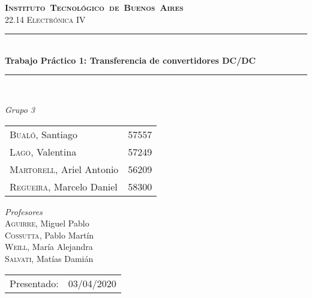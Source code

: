 \begin{titlepage}
\newcommand{\HRule}{\rule{\linewidth}{0.5mm}}
\center
\mbox{\textsc{\LARGE \bfseries {Instituto Tecnol\'ogico de Buenos Aires}}}\\[1.5cm]
\textsc{\Large 22.14 Electrónica IV}\\[0.5cm]


\HRule \\[0.6cm]
{ \Huge \bfseries Trabajo Pr\'actico 1: Transferencia de convertidores DC/DC}\\[0.4cm] %
\HRule \\[1.5cm]


{\large

\emph{Grupo 3}\\
\vspace{3px}

\begin{tabular}{lr} 	
\textsc{Bualó}, Santiago  & 57557 \\
\textsc{Lago}, Valentina  & 57249 \\
\textsc{Martorell}, Ariel Antonio & 56209 \\
\textsc{Regueira}, Marcelo Daniel  & 58300 \\
\end{tabular}

\vspace{20px}

\emph{Profesores}\\
\vspace{3px}
\textsc{Aguirre}, Miguel Pablo\\ 	
\textsc{Cossutta}, Pablo Martín\\ 	
\textsc{Weill}, María Alejandra\\ 	
\textsc{Salvati}, Matías Damián\\ 	

\vspace{100px}

\begin{tabular}{ll}

Presentado: & 03/04/2020\\

\end{tabular}

}

\vfill

\end{titlepage}